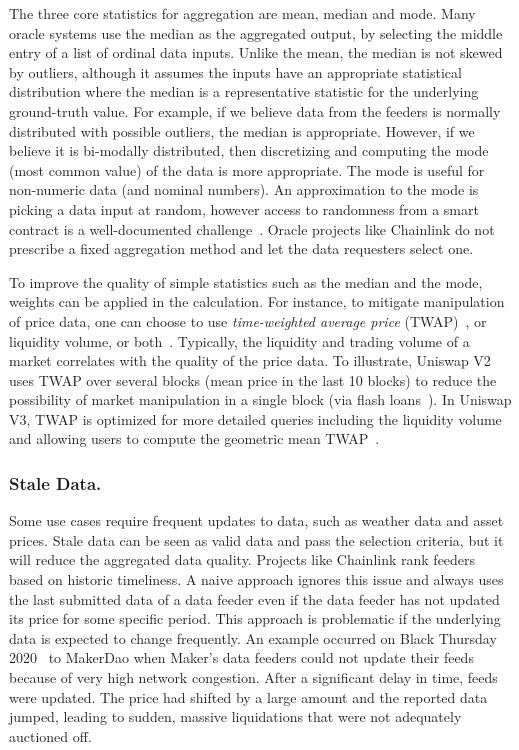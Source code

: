 The three core statistics for aggregation are mean, median and mode. Many oracle systems use the median as the aggregated output, by selecting the middle entry of a list of ordinal data inputs. Unlike the mean, the median is not skewed by  outliers, although it assumes the inputs have an appropriate statistical distribution where the median is a representative statistic for the underlying ground-truth value. For example, if we believe data from the feeders is normally distributed with possible outliers, the median is appropriate. However, if we believe it is bi-modally distributed, then discretizing and computing the mode (most common value) of the data is more appropriate. The mode is useful for non-numeric data (and nominal numbers). An approximation to the mode is picking a data input at random, however access to randomness from a smart contract is a well-documented challenge~\cite{chatterjee2019probabilistic,bunz2017proofs,chainlinkvrf}. Oracle projects like Chainlink do not prescribe a fixed aggregation method and let the data requesters select one.

To improve the quality of simple statistics such as the median and the mode, weights can be applied in the calculation. For instance, to mitigate manipulation of price data, one can choose to use \textit{time-weighted average price} (TWAP)~\cite{uniswaporacle}, or liquidity volume, or both~\cite{adams2021uniswap}. Typically, the liquidity and trading volume of a market correlates with the quality of the price data. To illustrate, Uniswap V2 uses TWAP over several blocks (\eg mean price in the last 10 blocks) to reduce the possibility of market manipulation in a single block (\eg via flash loans~\cite{qin2020attacking}). In Uniswap V3, TWAP is optimized for more detailed queries including the liquidity volume and allowing users to compute the geometric mean TWAP~\cite{adams2021uniswap}.

\subsubsection{Stale Data.}

Some use cases require frequent updates to data, such as weather data and asset prices. Stale data can be seen as valid data and pass the selection criteria, but it will reduce the aggregated data quality. Projects like Chainlink rank feeders based on historic timeliness. A naive approach ignores this issue and always uses the last submitted data of a data feeder even if the data feeder has not updated its price for some specific period. This approach is problematic if the underlying data is expected to change frequently. An example occurred on Black Thursday 2020~\cite{blackthursdayMaker} to MakerDao when Maker's data feeders could not update their feeds because of very high network congestion. After a significant delay in time, feeds were updated. The price had shifted by a large amount and the reported data jumped, leading to sudden, massive liquidations that were not adequately auctioned off. 

